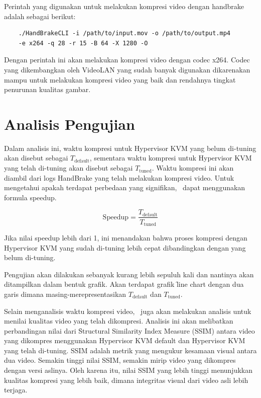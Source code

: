 Perintah yang digunakan untuk melakukan kompresi video dengan handbrake adalah sebagai berikut:

\begin{verbatim}
	./HandBrakeCLI -i /path/to/input.mov -o /path/to/output.mp4
	-e x264 -q 28 -r 15 -B 64 -X 1280 -O
\end{verbatim}

Dengan perintah ini \saya akan melakukan kompresi video dengan codec x264. Codec yang dikembangkan oleh VideoLAN yang sudah banyak digunakan dikarenakan mampu untuk melakukan kompresi video yang baik dan rendahnya tingkat penurunan kualitas gambar.

\section{Analisis Pengujian}
Dalam analisis ini, waktu kompresi untuk Hypervisor KVM yang belum di-tuning akan disebut sebagai $T_{\mathrm{default}}$, sementara waktu kompresi untuk Hypervisor KVM yang telah di-tuning akan disebut sebagai $T_{\mathrm{tuned}}$. Waktu kompresi ini akan diambil dari logs HandBrake yang telah melakukan kompresi video. Untuk mengetahui apakah terdapat perbedaan yang signifikan, \saya\ dapat menggunakan formula speedup. 

\[ \mathrm{Speedup} = \frac{T_{\mathrm{default}}}{T_{\mathrm{tuned}}} \]

Jika nilai speedup lebih dari 1, ini menandakan bahwa proses kompresi dengan Hypervisor KVM yang sudah di-tuning lebih cepat dibandingkan dengan yang belum di-tuning. 

Pengujian akan dilakukan sebanyak kurang lebih sepuluh kali dan nantinya akan ditampilkan dalam bentuk grafik. Akan terdapat grafik \f{line chart} dengan dua garis dimana masing-merepresentasikan $T_{\mathrm{default}}$ dan $T_{\mathrm{tuned}}$.

Selain menganalisis waktu kompresi video, \saya\ juga akan melakukan analisis untuk menilai kualitas video yang telah dikompresi. Analisis ini akan melibatkan perbandingan nilai dari \f{Structural Similarity Index Measure} (SSIM) antara video yang dikompres menggunakan Hypervisor KVM default dan Hypervisor KVM yang telah di-tuning. SSIM adalah metrik yang mengukur kesamaan visual antara dua video. Semakin tinggi nilai SSIM, semakin mirip video yang dikompres dengan versi aslinya. Oleh karena itu, nilai SSIM yang lebih tinggi menunjukkan kualitas kompresi yang lebih baik, dimana integritas visual dari video asli lebih terjaga.



